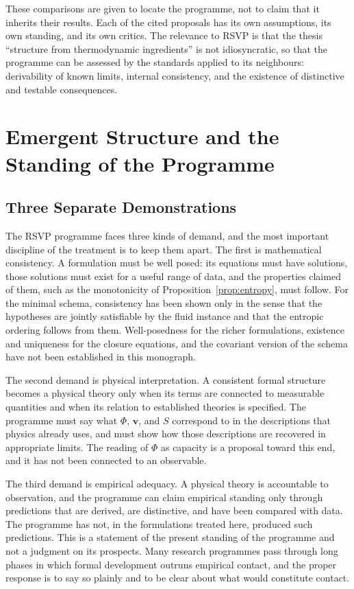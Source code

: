 \documentclass[11pt,twoside,openright]{book}
\theoremstyle{plain}
\theoremstyle{definition}
\theoremstyle{remark}
\newcommand{\rsvp}{RSVP}
\begin{document}
These comparisons are given to locate the programme, not to claim that it inherits their results. Each of the cited proposals has its own assumptions, its own standing, and its own critics. The relevance to \rsvp{} is that the thesis ``structure from thermodynamic ingredients'' is not idiosyncratic, so that the programme can be assessed by the standards applied to its neighbours: derivability of known limits, internal consistency, and the existence of distinctive and testable consequences.

\chapter{Emergent Structure and the Standing of the Programme}
\label{ch:standing}

\section{Three Separate Demonstrations}

The \rsvp{} programme faces three kinds of demand, and the most important discipline of the treatment is to keep them apart. The first is mathematical consistency. A formulation must be well posed: its equations must have solutions, those solutions must exist for a useful range of data, and the properties claimed of them, such as the monotonicity of Proposition~\ref{prop:entropy}, must follow. For the minimal schema, consistency has been shown only in the sense that the hypotheses are jointly satisfiable by the fluid instance and that the entropic ordering follows from them. Well-posedness for the richer formulations, existence and uniqueness for the closure equations, and the covariant version of the schema have not been established in this monograph.

The second demand is physical interpretation. A consistent formal structure becomes a physical theory only when its terms are connected to measurable quantities and when its relation to established theories is specified. The programme must say what $\Phi$, $\mathbf{v}$, and $S$ correspond to in the descriptions that physics already uses, and must show how those descriptions are recovered in appropriate limits. The reading of $\Phi$ as capacity is a proposal toward this end, and it has not been connected to an observable.

The third demand is empirical adequacy. A physical theory is accountable to observation, and the programme can claim empirical standing only through predictions that are derived, are distinctive, and have been compared with data. The programme has not, in the formulations treated here, produced such predictions. This is a statement of the present standing of the programme and not a judgment on its prospects. Many research programmes pass through long phases in which formal development outruns empirical contact, and the proper response is to say so plainly and to be clear about what would constitute contact.
\end{document}
